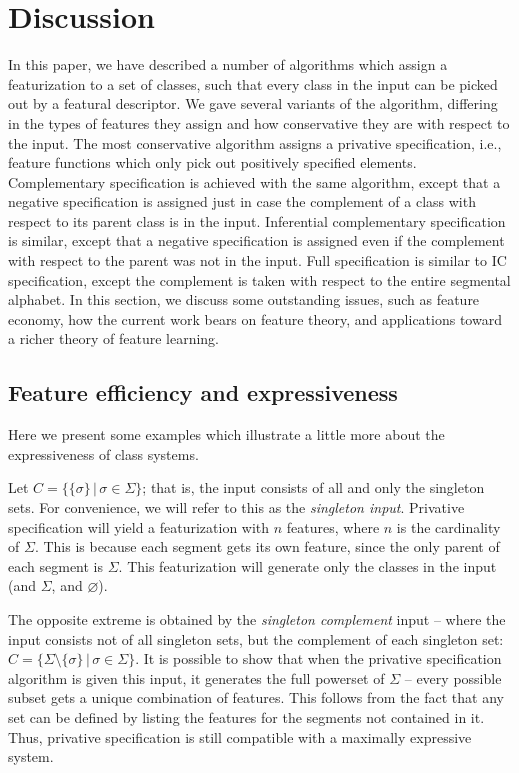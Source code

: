 \documentclass[12pt, oneside]{article}   	%
\begin{document}
\FloatBarrier
\section{Discussion}
\label{sec:discussion}

In this paper, we have described a number of algorithms which assign a featurization to a set of classes, such that every class in the input can be picked out by a featural descriptor. We gave several variants of the algorithm, differing in the types of features they assign and how conservative they are with respect to the input. The most conservative algorithm assigns a privative specification, i.e., feature functions which only pick out positively specified elements. Complementary specification is achieved with the same algorithm, except that a negative specification is assigned just in case the complement of a class with respect to its parent class is in the input. Inferential complementary specification is similar, except that a negative specification is assigned even if the complement with respect to the parent was not in the input. Full specification is similar to IC specification, except the complement is taken with respect to the entire segmental alphabet. In this section, we discuss some outstanding issues, such as feature economy, how the current work bears on feature theory, and applications toward a richer theory of feature learning.

\subsection{Feature efficiency and expressiveness}

Here we present some examples which illustrate a little more about the expressiveness of class systems.

Let $C = \{ \{\sigma\} \, | \, \sigma \in \Sigma \}$; that is, the input consists of all and only the singleton sets. For convenience, we will refer to this as the \textit{singleton input}. Privative specification will yield a featurization with $n$ features, where $n$ is the cardinality of $\Sigma$. This is because each segment gets its own feature, since the only parent of each segment is $\Sigma$. This featurization will generate only the classes in the input (and $\Sigma$, and $\varnothing$).

The opposite extreme is obtained by the \textit{singleton complement} input -- where the input consists not of all singleton sets, but the complement of each singleton set:  $C = \{ \Sigma \setminus \{\sigma\} \, | \, \sigma \in \Sigma \}$. It is possible to show that when the privative specification algorithm is given this input, it generates the full powerset of $\Sigma$ -- every possible subset gets a unique combination of features. This follows from the fact that any set can be defined by listing the features for the segments not contained in it. Thus, privative specification is still compatible with a maximally expressive system.
\end{document}
